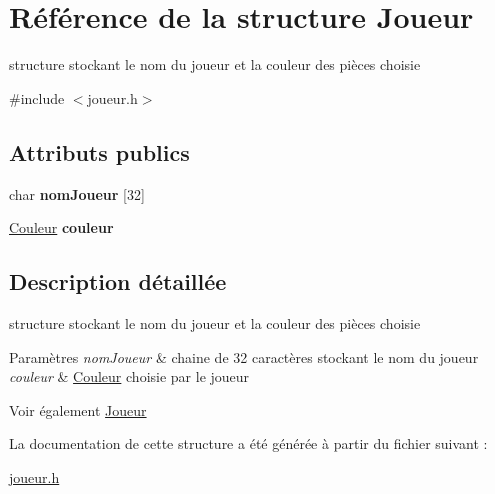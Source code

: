 \hypertarget{struct_joueur}{\section{Référence de la structure Joueur}
\label{struct_joueur}
}


structure stockant le nom du joueur et la couleur des pièces choisie  




{\ttfamily \#include $<$joueur.\-h$>$}

\subsection*{Attributs publics}
\begin{DoxyCompactItemize}
\item 
\hypertarget{struct_joueur_a433bba50464d9c58037d409f69895d10}{char {\bfseries nom\-Joueur} \mbox{[}32\mbox{]}}\label{struct_joueur_a433bba50464d9c58037d409f69895d10}

\item 
\hypertarget{struct_joueur_a966bbda4413e0b0d7aaf109660926639}{\hyperlink{struct_couleur}{Couleur} {\bfseries couleur}}\label{struct_joueur_a966bbda4413e0b0d7aaf109660926639}

\end{DoxyCompactItemize}


\subsection{Description détaillée}
structure stockant le nom du joueur et la couleur des pièces choisie 


\begin{DoxyParams}{Paramètres}
{\em nom\-Joueur} & chaine de 32 caractères stockant le nom du joueur \\
\hline
{\em couleur} & \hyperlink{struct_couleur}{Couleur} choisie par le joueur \\
\hline
\end{DoxyParams}
\begin{DoxySeeAlso}{Voir également}
\hyperlink{struct_joueur}{Joueur} 
\end{DoxySeeAlso}


La documentation de cette structure a été générée à partir du fichier suivant \-:\begin{DoxyCompactItemize}
\item 
\hyperlink{joueur_8h}{joueur.\-h}\end{DoxyCompactItemize}
